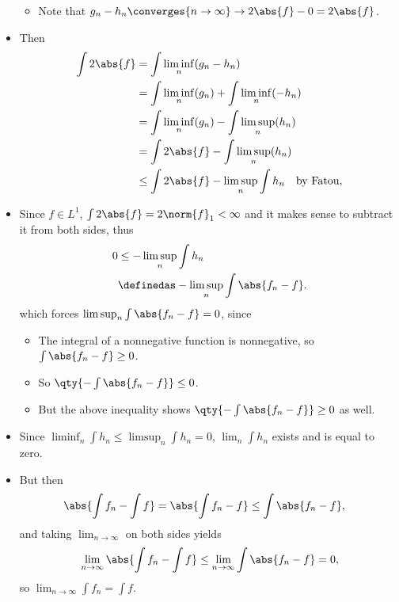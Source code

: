 \begin{solution}
\begin{itemize}
  \begin{itemize}
  \tightlist
  \item
    Note that
    \(g_n - h_n \converges{n\to\infty}\to 2\abs{f} - 0 = 2\abs{f}\).
  \end{itemize}
\item
  Then
  \begin{align*}
  \int 2 \abs {f} 
  &= \int \liminf_n (g_n - h_n) \\
  &= \int \liminf_n(g_n) + \int \liminf_n(-h_n) \\
  &= \int \liminf_n(g_n) - \int \limsup_n(h_n) \\
  &= \int 2 \abs{f} - \int \limsup_n(h_n) \\
  &\leq \int 2\abs{f} - \limsup_n \int h_n \quad\text{by Fatou}
  ,\end{align*}
\item
  Since \(f\in L^1\), \(\int 2\abs{f} = 2\norm{f}_1 < \infty\) and it
  makes sense to subtract it from both sides, thus
  \begin{align*}
  0 &\leq - \limsup_n \int h_n \\
  &\definedas - \limsup_n \int \abs{f_n - f}
  .\end{align*} which forces \(\limsup_n \int \abs{f_n -f} = 0\), since

  \begin{itemize}
  \tightlist
  \item
    The integral of a nonnegative function is nonnegative, so
    \(\int \abs{f_n - f} \geq 0\).
  \item
    So \(\qty{ -\int \abs{f_n - f} } \leq 0\).
  \item
    But the above inequality shows
    \(\qty{ -\int \abs{f_n - f} } \geq 0\) as well.
  \end{itemize}
\item
  Since \(\liminf_n \int h_n \leq \limsup_n \int h_n = 0\),
  \(\lim_n \int h_n\) exists and is equal to zero.
\item
  But then
  \begin{align*}
  \abs{\int f_n - \int f}
  &= \abs{\int f_n -f}
  \leq \int \abs{f_n - f}
  ,\end{align*} and taking \(\lim_{n\to\infty}\) on both sides yields
  \begin{align*}
  \lim_{n\to\infty} \abs{\int f_n - \int f} \leq \lim_{n\to\infty} \int \abs{f_n - f} = 0
  ,\end{align*} so \(\lim_{n\to\infty} \int f_n = \int f\).
\end{itemize}

\end{solution}

